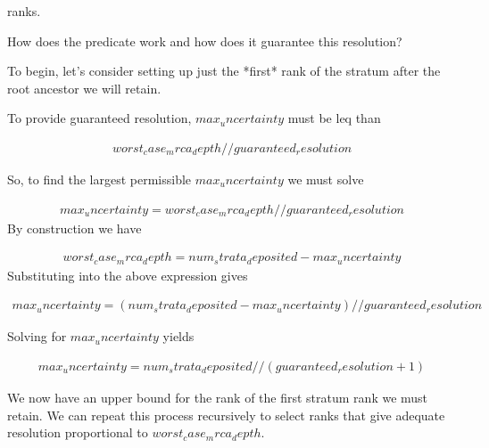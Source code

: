ranks.

How does the predicate work and how does it guarantee this resolution?

To begin, let's consider setting up just the *first* rank of the
stratum after the root ancestor we will retain.



To provide guaranteed resolution, $max_uncertainty$ must be leq than

\begin{align*}
   worst_case_mrca_depth // guaranteed_resolution
\end{align*}

So, to find the largest permissible $max_uncertainty$ we must solve

\begin{align*}
   max_uncertainty = worst_case_mrca_depth // guaranteed_resolution
\end{align*}
By construction we have

\begin{align*}
   worst_case_mrca_depth = num_strata_deposited - max_uncertainty
\end{align*}
Substituting into the above expression gives

\begin{align*}
   max_uncertainty
   = (num_strata_deposited - max_uncertainty) // guaranteed_resolution
\end{align*}

Solving for $max_uncertainty$ yields

\begin{align*}
  max_uncertainty
  = num_strata_deposited // (guaranteed_resolution + 1)
\end{align*}

We now have an upper bound for the rank of the first stratum rank
we must retain. We can repeat this process recursively to select
ranks that give adequate resolution proportional to
$worst_case_mrca_depth$.

